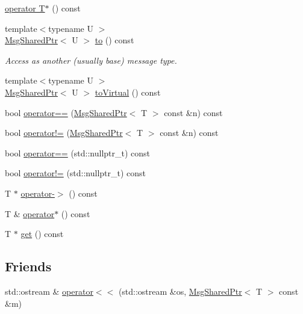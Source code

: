 \begin{DoxyCompactItemize}
\item 
\hyperlink{structvt_1_1messaging_1_1_msg_shared_ptr_a85b58c8af4068d8cfd4ad2ebb02d8111}{operator T$\ast$} () const
\item 
{\footnotesize template$<$typename U $>$ }\\\hyperlink{structvt_1_1messaging_1_1_msg_shared_ptr}{Msg\+Shared\+Ptr}$<$ U $>$ \hyperlink{structvt_1_1messaging_1_1_msg_shared_ptr_ae3d838b37f94f5f63ffc433518d46ada}{to} () const
\begin{DoxyCompactList}\small\item\em Access as another (usually base) message type. \end{DoxyCompactList}\item 
{\footnotesize template$<$typename U $>$ }\\\hyperlink{structvt_1_1messaging_1_1_msg_shared_ptr}{Msg\+Shared\+Ptr}$<$ U $>$ \hyperlink{structvt_1_1messaging_1_1_msg_shared_ptr_ab210c87a0489113368209634e76a72b8}{to\+Virtual} () const
\item 
bool \hyperlink{structvt_1_1messaging_1_1_msg_shared_ptr_a7f385be5d82602555a25a6737c779962}{operator==} (\hyperlink{structvt_1_1messaging_1_1_msg_shared_ptr}{Msg\+Shared\+Ptr}$<$ T $>$ const \&n) const
\item 
bool \hyperlink{structvt_1_1messaging_1_1_msg_shared_ptr_a1a37a82a49f68a91ef92ec675d2a324e}{operator!=} (\hyperlink{structvt_1_1messaging_1_1_msg_shared_ptr}{Msg\+Shared\+Ptr}$<$ T $>$ const \&n) const
\item 
bool \hyperlink{structvt_1_1messaging_1_1_msg_shared_ptr_a7da24c983c0b606a570138d928148298}{operator==} (std\+::nullptr\+\_\+t) const
\item 
bool \hyperlink{structvt_1_1messaging_1_1_msg_shared_ptr_a3d21051f673b7370ac6dcdaeac110e84}{operator!=} (std\+::nullptr\+\_\+t) const
\item 
T $\ast$ \hyperlink{structvt_1_1messaging_1_1_msg_shared_ptr_a4140dc4ea157de37d258c8f8821179c8}{operator-\/$>$} () const
\item 
T \& \hyperlink{structvt_1_1messaging_1_1_msg_shared_ptr_a609cd3703233ec7a0e26db0ff457b8f7}{operator$\ast$} () const
\item 
T $\ast$ \hyperlink{structvt_1_1messaging_1_1_msg_shared_ptr_a6e6e25e087e662d9171fa20b5092efdd}{get} () const
\end{DoxyCompactItemize}
\subsection*{Friends}
\begin{DoxyCompactItemize}
\item 
std\+::ostream \& \hyperlink{structvt_1_1messaging_1_1_msg_shared_ptr_ac412f09ec806f5915ea4a94f3e84d5f4}{operator$<$$<$} (std\+::ostream \&os, \hyperlink{structvt_1_1messaging_1_1_msg_shared_ptr}{Msg\+Shared\+Ptr}$<$ T $>$ const \&m)
\end{DoxyCompactItemize}


